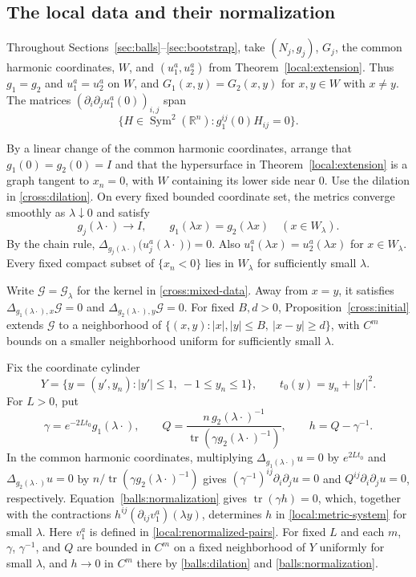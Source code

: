 \documentclass[11pt,a4paper]{article}
\theoremstyle{definition}
\theoremstyle{remark}
\numberwithin{equation}{section}
\begin{document}
\subsection{The local data and their normalization}
\label{balls:setup}

Throughout Sections~\ref{sec:balls}--\ref{sec:bootstrap}, take
$(N_j,g_j)$, $G_j$, the common harmonic coordinates, $W$, and
$(u_1^a,u_2^a)$ from Theorem~\ref{local:extension}.
Thus $g_1=g_2$ and $u_1^a=u_2^a$ on $W$, and
$G_1(x,y)=G_2(x,y)$ for $x,y\in W$ with $x\ne y$.
The matrices $(\partial_i\partial_j u_1^a(0))_{i,j}$ span
\[
 \{H\in\operatorname{Sym}^2(\mathbb R^n):
                 g_1^{ij}(0)H_{ij}=0\}.
\]

By a linear change of the common harmonic coordinates, arrange that
$g_1(0)=g_2(0)=I$ and that the hypersurface in
Theorem~\ref{local:extension} is a graph tangent to $x_n=0$, with $W$
containing its lower side near $0$. Use the dilation in
\eqref{cross:dilation}. On every fixed bounded coordinate set, the
metrics converge smoothly as $\lambda\downarrow0$ and satisfy
\begin{equation}\label{balls:dilation}
 g_j(\lambda\cdot)\longrightarrow I,\qquad
 g_1(\lambda x)=g_2(\lambda x)\quad(x\in W_\lambda).
\end{equation}
By the chain rule, $\Delta_{g_j(\lambda\cdot)}\bigl(u_j^a(\lambda\cdot)\bigr)=0$.
Also $u_1^a(\lambda x)=u_2^a(\lambda x)$ for $x\in W_\lambda$.
Every fixed compact subset of $\{x_n<0\}$ lies in $W_\lambda$
for sufficiently small $\lambda$.

Write $\mathcal G=\mathcal G_\lambda$ for the kernel in
\eqref{cross:mixed-data}. Away from $x=y$, it satisfies
$\Delta_{g_1(\lambda\cdot),x}\mathcal G=0$ and
$\Delta_{g_2(\lambda\cdot),y}\mathcal G=0$.
For fixed $B,d>0$, Proposition~\ref{cross:initial} extends $\mathcal G$
to a neighborhood of $\{(x,y):|x|,|y|\le B,\ |x-y|\ge d\}$, with
$C^m$ bounds on a smaller neighborhood uniform for sufficiently
small $\lambda$.

Fix the coordinate cylinder
\[
 Y=\{y=(y',y_n): |y'|\leq1,\ -1\leq y_n\leq1\},
 \qquad t_0(y)=y_n+|y'|^2.
\]
For $L>0$, put
\begin{equation}\label{balls:normalization}
 \gamma=e^{-2Lt_0}g_1(\lambda\cdot),\qquad
 Q=\frac{n\,g_2(\lambda\cdot)^{-1}}
          {\operatorname{tr}(\gamma g_2(\lambda\cdot)^{-1})},\qquad
 h=Q-\gamma^{-1}.
\end{equation}
In the common harmonic coordinates, multiplying
$\Delta_{g_1(\lambda\cdot)}u=0$ by $e^{2Lt_0}$ and
$\Delta_{g_2(\lambda\cdot)}u=0$ by
$n/\operatorname{tr}(\gamma g_2(\lambda\cdot)^{-1})$ gives
$(\gamma^{-1})^{ij}\partial_i\partial_j u=0$ and
$Q^{ij}\partial_i\partial_j u=0$, respectively.
Equation~\eqref{balls:normalization} gives $\operatorname{tr}(\gamma h)=0$,
which, together with the contractions $h^{ij}(\partial_{ij}v_1^a)(\lambda y)$,
determines $h$ in \eqref{local:metric-system} for small $\lambda$.
Here $v_1^a$ is defined in \eqref{local:renormalized-pairs}.
For fixed $L$ and each $m$, $\gamma$, $\gamma^{-1}$, and $Q$ are bounded
in $C^m$ on a fixed neighborhood of $Y$ uniformly for small $\lambda$,
and $h\to0$ in $C^m$ there by \eqref{balls:dilation} and
\eqref{balls:normalization}.
\end{document}
